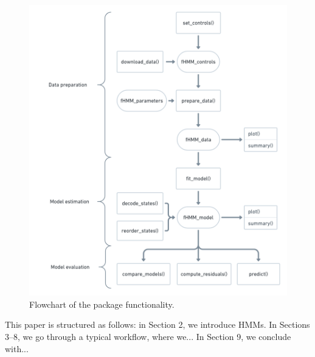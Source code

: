 \documentclass[article]{jss}
\begin{document}
\begin{figure}[t!]
  \centering
  \includegraphics[scale = 0.4]{flowchart.png}
  \caption{Flowchart of the package functionality.}
  \label{fig:flowchart}
\end{figure}

This paper is structured as follows: in Section 2, we introduce HMMs. In Sections 3--8, we go through a typical workflow, where we... In Section 9, we conclude with...

\end{document}
